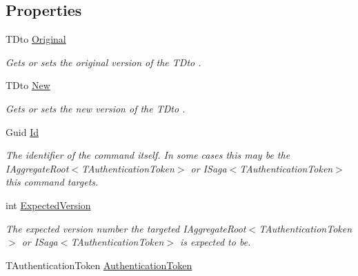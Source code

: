 \subsection*{Properties}
\begin{DoxyCompactItemize}
\item 
T\+Dto \hyperlink{classCqrs_1_1Commands_1_1DtoCommand_a67471c7e64228ee832343be7b89aa708_a67471c7e64228ee832343be7b89aa708}{Original}
\begin{DoxyCompactList}\small\item\em Gets or sets the original version of the {\itshape T\+Dto} . \end{DoxyCompactList}\item 
T\+Dto \hyperlink{classCqrs_1_1Commands_1_1DtoCommand_a9664c5705a6de37478bdb627590363e5_a9664c5705a6de37478bdb627590363e5}{New}
\begin{DoxyCompactList}\small\item\em Gets or sets the new version of the {\itshape T\+Dto} . \end{DoxyCompactList}\item 
Guid \hyperlink{classCqrs_1_1Commands_1_1DtoCommand_a14212f77b9341f240f77efa6d6adf211_a14212f77b9341f240f77efa6d6adf211}{Id}
\begin{DoxyCompactList}\small\item\em The identifier of the command itself. In some cases this may be the I\+Aggregate\+Root$<$\+T\+Authentication\+Token$>$ or I\+Saga$<$\+T\+Authentication\+Token$>$ this command targets. \end{DoxyCompactList}\item 
int \hyperlink{classCqrs_1_1Commands_1_1DtoCommand_a9429ca1b2c6576c36d46912a18e5dc18_a9429ca1b2c6576c36d46912a18e5dc18}{Expected\+Version}
\begin{DoxyCompactList}\small\item\em The expected version number the targeted I\+Aggregate\+Root$<$\+T\+Authentication\+Token$>$ or I\+Saga$<$\+T\+Authentication\+Token$>$ is expected to be. \end{DoxyCompactList}\item 
T\+Authentication\+Token \hyperlink{classCqrs_1_1Commands_1_1DtoCommand_aedf535bfbf04e3532c90e69548b85c32_aedf535bfbf04e3532c90e69548b85c32}{Authentication\+Token}

\end{DoxyCompactItemize}
